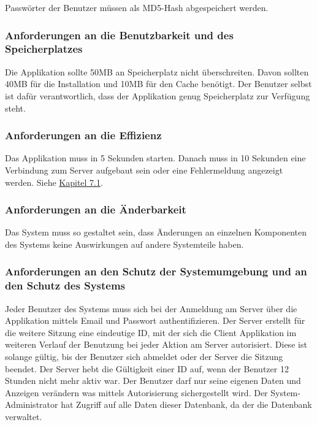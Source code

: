 \documentclass[a4paper,12pt,oneside]{scrartcl}
\begin{document}
Passwörter der Benutzer müssen als MD5-Hash abgespeichert werden.


\subsubsection{Anforderungen an die Benutzbarkeit und des Speicherplatzes}
Die Applikation sollte 50MB an Speicherplatz nicht überschreiten.
Davon sollten 40MB für die Installation und 10MB für den Cache benötigt.
Der Benutzer selbst ist dafür verantwortlich, dass der Applikation genug Speicherplatz zur Verfügung steht. 


\subsubsection{Anforderungen an die Effizienz}
Das Applikation muss in 5 Sekunden starten.
Danach muss in 10 Sekunden eine Verbindung zum Server aufgebaut sein oder eine Fehlermeldung angezeigt werden.
Siehe \hyperlink{s07}{Kapitel 7.1}.


\subsubsection{Anforderungen an die Änderbarkeit}
Das System muss so gestaltet sein, dass Änderungen an einzelnen Komponenten des Systems keine Auswirkungen auf andere Systemteile haben.


\subsubsection{Anforderungen an den Schutz der Systemumgebung und an den Schutz des Systems}
Jeder Benutzer des Systems muss sich bei der Anmeldung am Server über die Applikation mittels Email und Passwort authentifizieren.
Der Server erstellt für die weitere Sitzung eine eindeutige ID, mit der sich die Client Applikation im weiteren Verlauf der Benutzung bei jeder Aktion am Server autorisiert.
Diese ist solange gültig, bis der Benutzer sich abmeldet oder der Server die Sitzung beendet.
Der Server hebt die Gültigkeit einer ID auf, wenn der Benutzer 12 Stunden nicht mehr aktiv war.
Der Benutzer darf nur seine eigenen Daten und Anzeigen verändern was mittels Autorisierung sichergestellt wird.
Der System-Administrator hat Zugriff auf alle Daten dieser Datenbank, da der die Datenbank verwaltet. 
\end{document}
